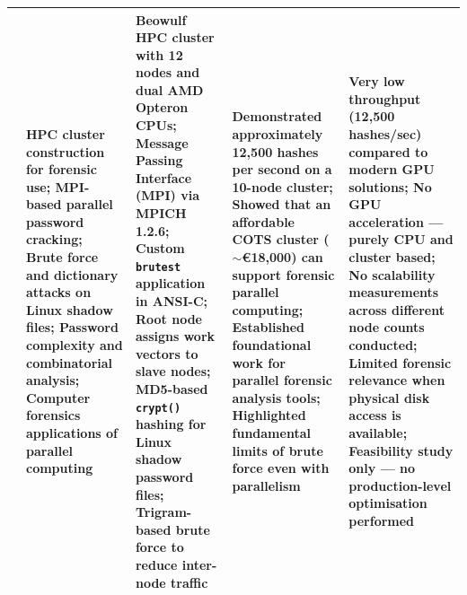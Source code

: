 \documentclass[12pt,a4paper]{article}
\begin{document}
\begin{longtable}[htp]{|p{2cm}|p{2.5cm}|p{2.5cm}|p{3cm}|p{3.5cm}|}
\hline \cite{bengtsson_parallel_2007} & HPC cluster construction for forensic use; MPI-based parallel password cracking; Brute force and dictionary attacks on Linux shadow files; Password complexity and combinatorial analysis; Computer forensics applications of parallel computing & Beowulf HPC cluster with 12 nodes and dual AMD Opteron CPUs; Message Passing Interface (MPI) via MPICH 1.2.6; Custom \texttt{brutest} application in ANSI-C; Root node assigns work vectors to slave nodes; MD5-based \texttt{crypt()} hashing for Linux shadow password files; Trigram-based brute force to reduce inter-node traffic & Demonstrated approximately 12,500 hashes per second on a 10-node cluster; Showed that an affordable COTS cluster ($\sim$\euro{}18,000) can support forensic parallel computing; Established foundational work for parallel forensic analysis tools; Highlighted fundamental limits of brute force even with parallelism & Very low throughput (12,500 hashes/sec) compared to modern GPU solutions; No GPU acceleration --- purely CPU and cluster based; No scalability measurements across different node counts conducted; Limited forensic relevance when physical disk access is available; Feasibility study only --- no production-level optimisation performed \\

\hline
\end{longtable}

	
	
	\newpage
\end{document}
